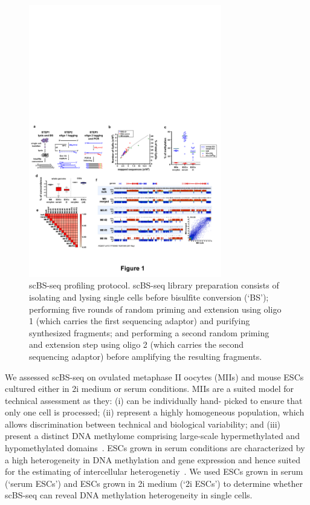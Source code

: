 \begin{figure}[htbp!]
\centering
\includegraphics[width=0.75\textwidth]{proto}
\caption[scBS-seq profiling protocol.]{scBS-seq profiling protocol. scBS-seq library preparation consists of isolating and lysing single cells before bisulfite conversion (`BS'); performing five rounds of random priming and extension using oligo 1 (which carries the first sequencing adaptor) and purifying synthesized fragments; and performing a second random priming and extension step using oligo 2 (which carries the second sequencing adaptor) before amplifying the resulting fragments.}
\label{fig:bs_proto}
\end{figure}

We assessed scBS-seq on ovulated metaphase II oocytes (MIIs) and mouse ESCs cultured either in 2i medium or serum conditions. MIIs are a suited model for technical assessment as they: (i) can be individually hand- picked to ensure that only one cell is processed; (ii) represent a highly homogeneous population, which allows discrimination between technical and biological variability; and (iii) present a distinct DNA methylome comprising large-scale hypermethylated and hypomethylated domains~\citep{shirane_mouse_2013}. ESCs grown in serum conditions are characterized by a high heterogeneity in DNA methylation and gene expression and hence suited for the estimating of intercellular heterogenetiy~\citep{ficz_fgf_2013}. We used ESCs grown in serum (`serum ESCs') and ESCs grown in 2i medium (`2i ESCs') to determine whether scBS-seq can reveal DNA methylation heterogeneity in single cells.

